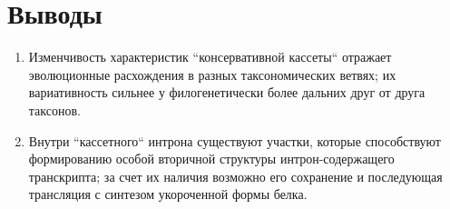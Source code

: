 \clearpage
\section{Выводы}

\begin{enumerate}[left=\parindent]
    \item Изменчивость характеристик ``консервативной кассеты`` отражает эволюционные расхождения в разных таксономических ветвях; их вариативность сильнее у филогенетически более дальних друг от друга таксонов.
    \item Внутри ``кассетного`` интрона существуют участки, которые способствуют формированию особой вторичной структуры интрон-содержащего транскрипта; за счет их наличия возможно его сохранение и последующая трансляция с синтезом укороченной формы белка.
\end{enumerate}
